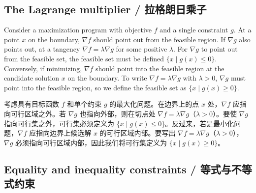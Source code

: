 \subsection{The Lagrange multiplier / 拉格朗日乘子}

\begin{original}
Consider a maximization program with objective $f$ and a single constraint $g$. At a point $x$ on the boundary, $\nabla f$ should point out from the feasible region. If $\nabla g$ also points out, at a tangency $\nabla f = \lambda \nabla g$ for some positive $\lambda$. For $\nabla g$ to point out from the feasible set, the feasible set must be defined $\{x \mid g(x) \le 0\}$. Conversely, if minimizing, $\nabla f$ should point into the feasible region at the candidate solution $x$ on the boundary. To write $\nabla f = \lambda \nabla g$ with $\lambda > 0$, $\nabla g$ must point into the feasible region, so we define the feasible set as $\{x \mid g(x) \ge 0\}$.
\end{original}
\begin{translation}
考虑具有目标函数 $f$ 和单个约束 $g$ 的最大化问题。在边界上的点 $x$ 处，$\nabla f$ 应指向可行区域之外。若 $\nabla g$ 也指向外部，则在切点处 $\nabla f = \lambda \nabla g$（$\lambda > 0$）。要使 $\nabla g$ 指向可行集之外，可行集必须定义为 $\{x \mid g(x) \le 0\}$。反过来，若是最小化问题，$\nabla f$ 应指向边界上候选解 $x$ 的可行区域内部。要写出 $\nabla f = \lambda \nabla g$（$\lambda > 0$），$\nabla g$ 必须指向可行区域内部，因此我们将可行集定义为 $\{x \mid g(x) \ge 0\}$。
\end{translation}

\subsection{Equality and inequality constraints / 等式与不等式约束}

